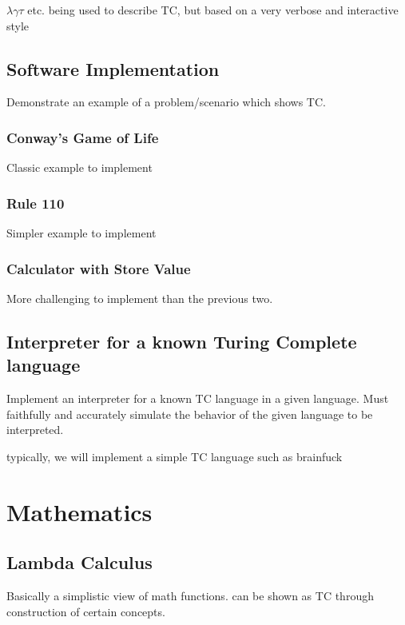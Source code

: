 $\lambda \gamma \tau $ etc. being used to describe TC, but based on a very verbose and interactive style

\subsection{Software Implementation}

Demonstrate an example of a problem/scenario which shows TC.

\subsubsection{Conway's Game of Life}

Classic example to implement

\subsubsection{Rule 110}

Simpler example to implement

\subsubsection{Calculator with Store Value}

More challenging to implement than the previous two.

\subsection{Interpreter for a known Turing Complete language}

Implement an interpreter for a known TC language in a given language.
Must faithfully and accurately simulate the behavior of the given language to be interpreted.

typically, we will implement a simple TC language such as brainfuck

\section{Mathematics}

\subsection{Lambda Calculus}

Basically a simplistic view of math functions.
can be shown as TC through construction of certain concepts.